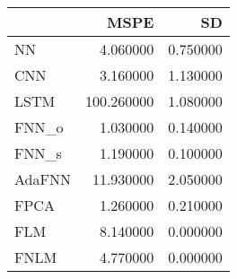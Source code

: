 \begin{tabular}{lrr}
\toprule
 & MSPE & SD \\
\midrule
NN & 4.060000 & 0.750000 \\
CNN & 3.160000 & 1.130000 \\
LSTM & 100.260000 & 1.080000 \\
FNN_o & 1.030000 & 0.140000 \\
FNN_s & 1.190000 & 0.100000 \\
AdaFNN & 11.930000 & 2.050000 \\
FPCA & 1.260000 & 0.210000 \\
FLM & 8.140000 & 0.000000 \\
FNLM & 4.770000 & 0.000000 \\
\bottomrule
\end{tabular}

